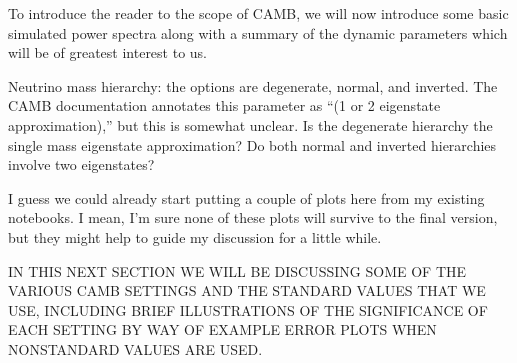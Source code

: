 \documentclass[11pt]{article}
\begin{document}
To introduce the reader to the scope of CAMB, we will now introduce
some basic simulated power spectra along with a summary of the dynamic
parameters which will be of greatest interest to us.

Neutrino mass hierarchy: the options are degenerate, normal, and inverted.
The CAMB documentation annotates this parameter as ``(1 or 2 eigenstate
approximation),'' but this is somewhat unclear. Is the degenerate
hierarchy the single mass eigenstate approximation? Do both normal
and inverted hierarchies involve two eigenstates?

I guess we could already start putting a couple of plots here from my existing
notebooks. I mean, I'm sure none of these plots will survive to the final
version, but they might help to guide my discussion for a little while.

IN THIS NEXT SECTION WE WILL BE DISCUSSING SOME OF THE VARIOUS CAMB SETTINGS
AND THE STANDARD VALUES THAT WE USE, INCLUDING BRIEF ILLUSTRATIONS OF THE
SIGNIFICANCE OF EACH SETTING BY WAY OF EXAMPLE ERROR PLOTS WHEN NONSTANDARD
VALUES ARE USED.
\end{document}

